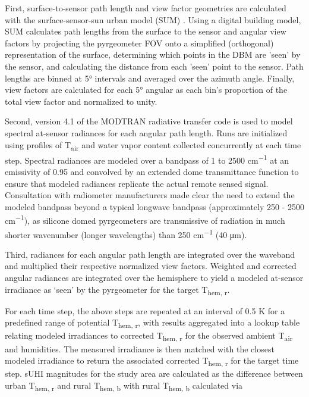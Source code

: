 First, surface-to-sensor path length and view factor geometries are calculated with the surface-sensor-sun urban model (SUM) \cite{Soux2004}. Using a digital building model, SUM calculates path lengths from the surface to the sensor and angular view factors by projecting the pyrgeometer FOV onto a simplified (orthogonal) representation of the surface, determining which points in the DBM are 'seen' by the sensor, and calculating the distance from each 'seen' point to the sensor. Path lengths are binned at 5\si{\degree} intervals and averaged over the azimuth angle. Finally, view factors are calculated for each 5\si{\degree} angular as each bin's proportion of the total view factor and normalized to unity.

Second, version 4.1 of the MODTRAN radiative transfer code \cite{Berk1987} is used to model spectral at-sensor radiances for each angular path length. Runs are initialized using profiles of T\textsubscript{air} and water vapor content collected concurrently at each time step. Spectral radiances are modeled over a bandpass of 1 to 2500 \si{cm^{-1}} at an emissivity of 0.95 and convolved by an extended dome transmittance function to ensure that modeled radiances replicate the actual remote sensed signal. Consultation with radiometer manufacturers made clear the need to extend the modeled bandpass beyond a typical longwave bandpass (approximately 250 - 2500 \si{cm^{-1}}), as silicone domed pyrgeometers are transmissive of radiation in much shorter wavenumber (longer wavelengths) than 250 \si{cm^{-1}} (40 \si{\micro\meter}).

Third, radiances for each angular path length are integrated over the waveband and multiplied their respective normalized view factors. Weighted and corrected angular radiances are integrated over the hemisphere to yield a modeled at-sensor irradiance as ‘seen’ by the pyrgeometer for the target T\textsubscript{hem, r}. 

For each time step, the above steps are repeated at an interval of 0.5 \si{\kelvin} for a predefined range of potential T\textsubscript{hem, r}, with results aggregated into a lookup table relating modeled irradiances to corrected T\textsubscript{hem, r} for the observed ambient T\textsubscript{air} and humidities. The measured irradiance is then matched with the closest modeled irradiance to return the associated corrected T\textsubscript{hem, r} for the target time step. sUHI magnitudes for the study area are calculated as the difference between urban T\textsubscript{hem, r} and rural T\textsubscript{hem, b} with rural T\textsubscript{hem, b} calculated via

